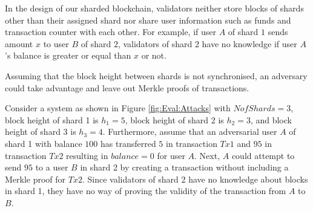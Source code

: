 In the design of our sharded blockchain, validators neither store blocks of shards other than their assigned shard nor share user information such as funds and transaction counter with each other. For example, if user $A$ of shard $1$ sends amount $x$ to user $B$ of shard $2$, validators of shard $2$ have no knowledge if user $A$'s balance is greater or equal than $x$ or not.

Assuming that the block height between shards is not synchronised, an adversary could take advantage and leave out Merkle proofs of transactions.

\begin{example}
\label{ex:DoubleSpending}
Consider a system as shown in Figure \ref{fig:Eval:Attacks} with $NofShards = 3$, block height of shard 1 is $h_1 = 5$, block height of shard 2 is $h_2 = 3$, and block height of shard 3 is $h_3 = 4$. Furthermore, assume that an adversarial user $A$ of shard 1 with balance $100$ has transferred $5$ in transaction $Tx1$ and $95$ in transaction $Tx2$ resulting in $balance = 0$ for user $A$. Next, $A$ could attempt to send $95$ to a user $B$ in shard 2 by creating a transaction without including a Merkle proof for $Tx2$. Since validators of shard 2 have no knowledge about blocks in shard 1, they have no way of proving the validity of the transaction from $A$ to $B$.

\begin{figure}[hbt]
  \centering
\end{figure}
\end{example}
